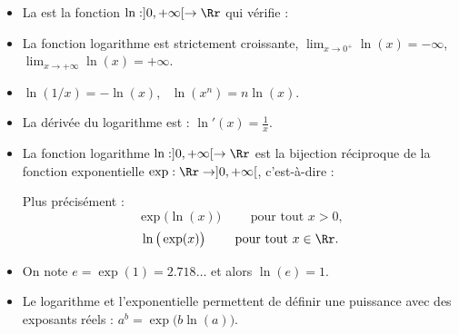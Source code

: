 \documentclass[11pt,class=report,crop=false]{standalone}
\begin{document}
\begin{cours}
\sauteligne




\begin{itemize}
  \item La  est la fonction $\ln : ]0,+\infty[ \to \Rr$ qui vérifie :
  
  \smallskip
  

  \item La fonction logarithme est strictement croissante,
  $\lim_{x\to 0^+} \ln(x) = -\infty$, \ $\lim_{x\to+\infty} \ln(x) = +\infty$.
    
  \item $\ln(1/x) = -\ln(x)$, \ $\ln(x^n) = n\ln(x)$.

  \item La dérivée du logarithme est : $\ln'(x) = \frac1x$.
  
  \item La fonction logarithme $\ln : ]0,+\infty[ \to \Rr$ est la bijection réciproque de la fonction exponentielle $\exp : \Rr \to ]0,+\infty[$, c'est-à-dire :
  
  Plus précisément :
  $$\exp\big(\ln(x) \big) \qquad \text{ pour tout } x >0,$$
  $$\ln\big(\exp(x) \big) \qquad \text{ pour tout } x \in \Rr.$$
  
  
  \item On note $e=\exp(1) = 2.718\ldots$ et alors $\ln(e)=1$. 
    
  \item Le logarithme et l'exponentielle permettent de définir une puissance avec des exposants réels :
   $a^b = \exp\big(b \ln(a) \big)$.
  \end{itemize}
  
  
\end{cours}

\end{document}
